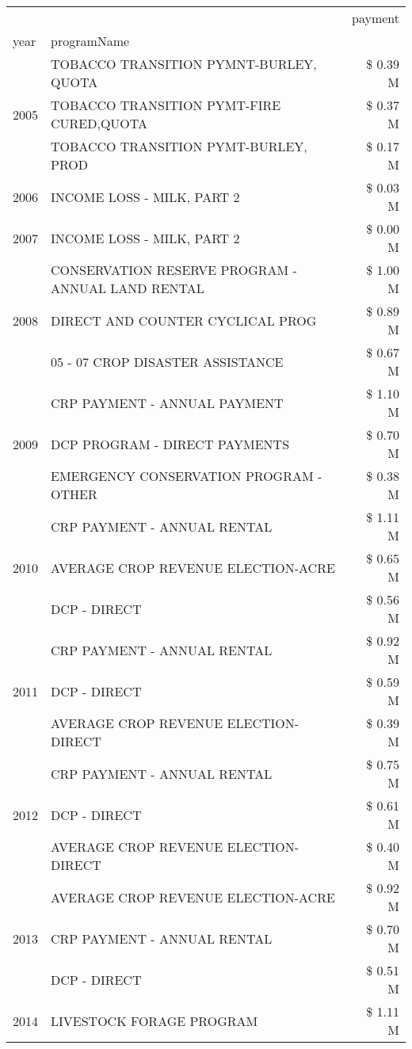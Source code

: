 \begin{tabular}{llr}
\toprule
 &  & payment \\
year & programName &  \\
\midrule
\multirow[t]{3}{*}{2005} & TOBACCO TRANSITION PYMNT-BURLEY, QUOTA & \$ 0.39 M \\
 & TOBACCO TRANSITION PYMT-FIRE CURED,QUOTA & \$ 0.37 M \\
 & TOBACCO TRANSITION PYMT-BURLEY, PROD & \$ 0.17 M \\
\cline{1-3}
2006 & INCOME LOSS - MILK, PART 2 & \$ 0.03 M \\
\cline{1-3}
2007 & INCOME LOSS - MILK, PART 2 & \$ 0.00 M \\
\cline{1-3}
\multirow[t]{3}{*}{2008} & CONSERVATION RESERVE PROGRAM - ANNUAL LAND RENTAL & \$ 1.00 M \\
 & DIRECT AND COUNTER CYCLICAL PROG & \$ 0.89 M \\
 & 05 - 07 CROP DISASTER ASSISTANCE & \$ 0.67 M \\
\cline{1-3}
\multirow[t]{3}{*}{2009} & CRP PAYMENT - ANNUAL PAYMENT & \$ 1.10 M \\
 & DCP PROGRAM - DIRECT PAYMENTS & \$ 0.70 M \\
 & EMERGENCY CONSERVATION PROGRAM - OTHER & \$ 0.38 M \\
\cline{1-3}
\multirow[t]{3}{*}{2010} & CRP PAYMENT - ANNUAL RENTAL & \$ 1.11 M \\
 & AVERAGE CROP REVENUE ELECTION-ACRE & \$ 0.65 M \\
 & DCP - DIRECT & \$ 0.56 M \\
\cline{1-3}
\multirow[t]{3}{*}{2011} & CRP PAYMENT - ANNUAL RENTAL & \$ 0.92 M \\
 & DCP - DIRECT & \$ 0.59 M \\
 & AVERAGE CROP REVENUE ELECTION-DIRECT & \$ 0.39 M \\
\cline{1-3}
\multirow[t]{3}{*}{2012} & CRP PAYMENT - ANNUAL RENTAL & \$ 0.75 M \\
 & DCP - DIRECT & \$ 0.61 M \\
 & AVERAGE CROP REVENUE ELECTION-DIRECT & \$ 0.40 M \\
\cline{1-3}
\multirow[t]{3}{*}{2013} & AVERAGE CROP REVENUE ELECTION-ACRE & \$ 0.92 M \\
 & CRP PAYMENT - ANNUAL RENTAL & \$ 0.70 M \\
 & DCP - DIRECT & \$ 0.51 M \\
\cline{1-3}
\multirow[t]{3}{*}{2014} & LIVESTOCK FORAGE PROGRAM & \$ 1.11 M \\

\end{tabular}

